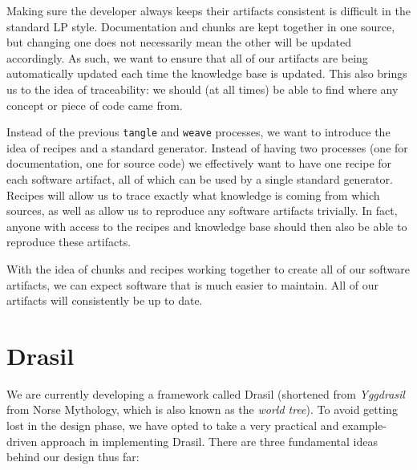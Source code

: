 \documentclass[preprint, 10pt]{sigplanconf}
\begin{document}
Making sure the developer always keeps their artifacts consistent is difficult
in the standard LP style. Documentation and chunks are kept together in one
source, but changing one does not necessarily mean the other will be updated
accordingly. As such, we want to ensure that all of our artifacts are being
automatically updated each time the knowledge base is updated. This
also brings us to the idea of traceability: we should (at all times) be able to
find where any concept or piece of code came from.

Instead of the previous \verb|tangle| and \verb|weave| processes, we want to
introduce the idea of recipes and a standard generator. Instead of having two
processes (one for documentation, one for source code) we effectively want to
have one recipe for each software artifact, all of which can be used by a single
standard generator. Recipes will allow us to trace exactly what knowledge is
coming from which sources, as well as allow us to reproduce any software
artifacts trivially. In fact, anyone with access to the recipes and knowledge
base should then also be able to reproduce these artifacts.

With the idea of chunks and recipes working together to create all of our
software artifacts, we can expect software that is much easier to maintain. All
of our artifacts will consistently be up to date.

\section{Drasil}
\label{sec:Drasil}

We are currently developing a framework called Drasil (shortened from
\emph{Yggdrasil} from Norse Mythology, which is also known as the \emph{world
tree}). To avoid getting lost in the design phase, we have opted to take a very
practical and example-driven approach in implementing Drasil. There are three
fundamental ideas behind our design thus far:
\end{document}
